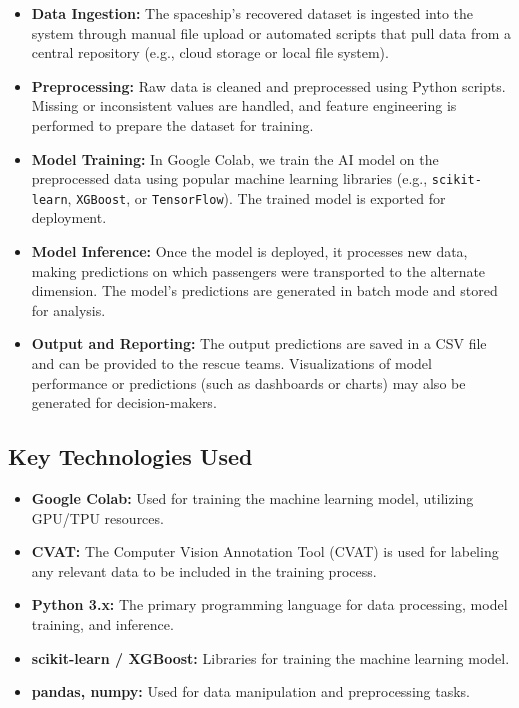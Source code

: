 \documentclass[15pt]{article}
\begin{document}
\begin{itemize}
    \item \textbf{Data Ingestion:} The spaceship’s recovered dataset is ingested into the system through manual file upload or automated scripts that pull data from a central repository (e.g., cloud storage or local file system).
    \item \textbf{Preprocessing:} Raw data is cleaned and preprocessed using Python scripts. Missing or inconsistent values are handled, and feature engineering is performed to prepare the dataset for training.
    \item \textbf{Model Training:} In Google Colab, we train the AI model on the preprocessed data using popular machine learning libraries (e.g., \texttt{scikit-learn}, \texttt{XGBoost}, or \texttt{TensorFlow}). The trained model is exported for deployment.
    \item \textbf{Model Inference:} Once the model is deployed, it processes new data, making predictions on which passengers were transported to the alternate dimension. The model’s predictions are generated in batch mode and stored for analysis.
    \item \textbf{Output and Reporting:} The output predictions are saved in a CSV file and can be provided to the rescue teams. Visualizations of model performance or predictions (such as dashboards or charts) may also be generated for decision-makers.
\end{itemize}

\subsection{Key Technologies Used}
\begin{itemize}
    \item \textbf{Google Colab:} Used for training the machine learning model, utilizing GPU/TPU resources.
    \item \textbf{CVAT:} The Computer Vision Annotation Tool (CVAT) is used for labeling any relevant data to be included in the training process.
    \item \textbf{Python 3.x:} The primary programming language for data processing, model training, and inference.
    \item \textbf{scikit-learn / XGBoost:} Libraries for training the machine learning model.
    \item \textbf{pandas, numpy:} Used for data manipulation and preprocessing tasks.
\end{itemize}
\end{document}
